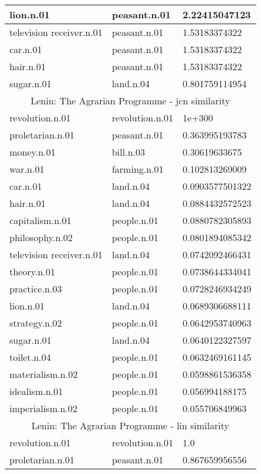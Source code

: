 \begin{center}
\begin{tabular}{ | l | l | l |}
lion.n.01 & peasant.n.01 & 2.22415047123 \\ \hline
television receiver.n.01 & peasant.n.01 & 1.53183374322 \\ \hline
car.n.01 & peasant.n.01 & 1.53183374322 \\ \hline
hair.n.01 & peasant.n.01 & 1.53183374322 \\ \hline
sugar.n.01 & land.n.04 & 0.801759114954 \\ \hline
\multicolumn{3}{|c|}{Lenin: The Agrarian Programme  - jcn similarity} \\ \hline
revolution.n.01 & revolution.n.01 & 1e+300 \\ \hline
proletarian.n.01 & peasant.n.01 & 0.363995193783 \\ \hline
money.n.01 & bill.n.03 & 0.30619633675 \\ \hline
war.n.01 & farming.n.01 & 0.102813269009 \\ \hline
car.n.01 & land.n.04 & 0.0903577501322 \\ \hline
hair.n.01 & land.n.04 & 0.0884432572523 \\ \hline
capitalism.n.01 & people.n.01 & 0.0880782305893 \\ \hline
philosophy.n.02 & people.n.01 & 0.0801894085342 \\ \hline
television receiver.n.01 & land.n.04 & 0.0742092466431 \\ \hline
theory.n.01 & people.n.01 & 0.0738644334041 \\ \hline
practice.n.03 & people.n.01 & 0.0728246934249 \\ \hline
lion.n.01 & land.n.04 & 0.0689306688111 \\ \hline
strategy.n.02 & people.n.01 & 0.0642953740963 \\ \hline
sugar.n.01 & land.n.04 & 0.0640122327597 \\ \hline
toilet.n.04 & people.n.01 & 0.0632469161145 \\ \hline
materialism.n.02 & people.n.01 & 0.0598861536358 \\ \hline
idealism.n.01 & people.n.01 & 0.056994188175 \\ \hline
imperialism.n.02 & people.n.01 & 0.055706849963 \\ \hline
\multicolumn{3}{|c|}{Lenin: The Agrarian Programme  - lin similarity} \\ \hline
revolution.n.01 & revolution.n.01 & 1.0 \\ \hline
proletarian.n.01 & peasant.n.01 & 0.867659956556 \\ \hline

\end{tabular}
\end{center}
